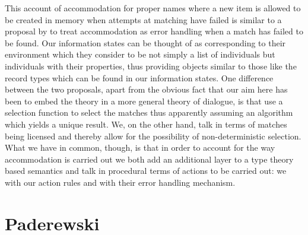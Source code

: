This account of accommodation for proper names where a new item is
allowed to be created in memory when attempts at matching have failed
is similar to a proposal by \cite{GrooteLebedeva2010} to treat
accommodation as error handling when a match has failed to be found.
Our information states can be thought of as corresponding to their
environment which they consider to be not simply a list of individuals
but individuals with their properties, thus providing objects similar
to those like the record types which can be found in our information
states.  One difference between the two proposals, apart from the
obvious fact that our aim here has been to embed the theory in a more
general theory of dialogue, is that
\citeauthor{GrooteLebedeva2010} use a selection function to select the
matches thus apparently assuming an algorithm which yields a unique
result.  We, on the other hand, talk in terms of matches being licensed
and thereby allow for the possibility of non-deterministic
selection. What we have in common, though, is that in order to account
for the way accommodation is carried out we both add an additional
layer to a type
theory based  semantics and talk in procedural terms of
actions to be carried out:  we with our action rules and
\citeauthor{GrooteLebedeva2010} with their error handling mechanism.


     
\section{Paderewski}
\label{sec:Paderewski}

